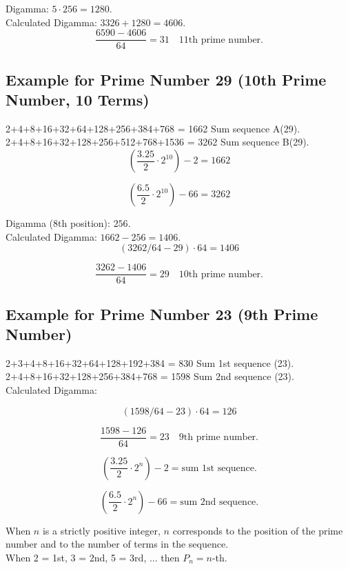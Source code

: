 \documentclass[a4paper,11pt]{article}
\begin{document}
Digamma: \(5 \cdot 256 = 1280\).\\
Calculated Digamma: \(3326 + 1280 = 4606\).\\

\[
\frac{6590 - 4606}{64} = 31 \quad \text{11th prime number.}
\]

\bigskip

\subsection*{Example for Prime Number 29 (10th Prime Number, 10 Terms)}

2+4+8+16+32+64+128+256+384+768 = 1662 Sum sequence A(29).\\
2+4+8+16+32+128+256+512+768+1536 = 3262 Sum sequence B(29).\\

\[
\left(\frac{3.25}{2} \cdot 2^{10}\right) - 2 = 1662
\]

\[
\left(\frac{6.5}{2} \cdot 2^{10}\right) - 66 = 3262
\]

Digamma (8th position): \(256\).\\
Calculated Digamma: \(1662 - 256 = 1406\).\\

\[
(3262/64 - 29) \cdot 64 = 1406
\]

\[
\frac{3262 - 1406}{64} = 29 \quad \text{10th prime number.}
\]

\bigskip

\subsection*{Example for Prime Number 23 (9th Prime Number)}

2+3+4+8+16+32+64+128+192+384 = 830 Sum 1st sequence (23).\\
2+4+8+16+32+128+256+384+768 = 1598 Sum 2nd sequence (23).\\

Calculated Digamma:

\[
(1598/64 - 23) \cdot 64 = 126
\]

\[
\frac{1598 - 126}{64} = 23 \quad \text{9th prime number.}
\]

\[
\left(\frac{3.25}{2} \cdot 2^{n}\right) - 2 = \text{sum 1st sequence.}
\]

\[
\left(\frac{6.5}{2} \cdot 2^{n}\right) - 66 = \text{sum 2nd sequence.}
\]

When \(n\) is a strictly positive integer, \(n\) corresponds to the position of the prime number and to the number of terms in the sequence.\\
When 2 = 1st, 3 = 2nd, 5 = 3rd, ... then \(P_{n} = n\)-th.
\end{document}
